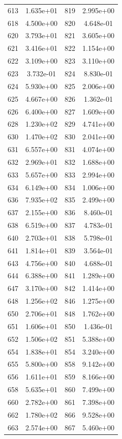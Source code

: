 \documentclass[12pt]{article}
\begin{document}
\begin{longtable}{@{}cccc@{}}
613 & 1.635e+01 & 819 & 2.995e+00 \\
618 & 4.500e+00 & 820 & 4.648e-01 \\
620 & 3.793e+01 & 821 & 3.605e+00 \\
621 & 3.416e+01 & 822 & 1.154e+00 \\
622 & 3.109e+00 & 823 & 3.110e+00 \\
623 & 3.732e-01 & 824 & 8.830e-01 \\
624 & 5.930e+00 & 825 & 2.006e+00 \\
625 & 4.667e+00 & 826 & 1.362e-01 \\
626 & 6.400e+00 & 827 & 1.609e+00 \\
628 & 1.230e+02 & 829 & 4.741e+00 \\
630 & 1.470e+02 & 830 & 2.041e+00 \\
631 & 6.557e+00 & 831 & 4.074e+00 \\
632 & 2.969e+01 & 832 & 1.688e+00 \\
633 & 5.657e+00 & 833 & 2.994e+00 \\
634 & 6.149e+00 & 834 & 1.006e+00 \\
636 & 7.935e+02 & 835 & 2.499e+00 \\
637 & 2.155e+00 & 836 & 8.460e-01 \\
638 & 6.519e+00 & 837 & 4.783e-01 \\
640 & 2.703e+01 & 838 & 5.798e-01 \\
641 & 1.814e+01 & 839 & 3.564e-01 \\
643 & 4.756e+00 & 840 & 4.688e-01 \\
644 & 6.388e+00 & 841 & 1.289e+00 \\
647 & 3.170e+00 & 842 & 1.414e+00 \\
648 & 1.256e+02 & 846 & 1.275e+00 \\
650 & 2.706e+01 & 848 & 1.762e+00 \\
651 & 1.606e+01 & 850 & 1.436e-01 \\
652 & 1.506e+02 & 851 & 5.388e+00 \\
654 & 1.838e+01 & 854 & 3.240e+00 \\
655 & 5.800e+00 & 858 & 9.142e+00 \\
656 & 1.611e+01 & 859 & 8.166e+00 \\
658 & 5.635e+01 & 860 & 7.499e+00 \\
660 & 2.782e+00 & 861 & 7.398e+00 \\
662 & 1.780e+02 & 866 & 9.528e+00 \\
663 & 2.574e+00 & 867 & 5.460e+00 \\

\end{longtable}
\end{document}
